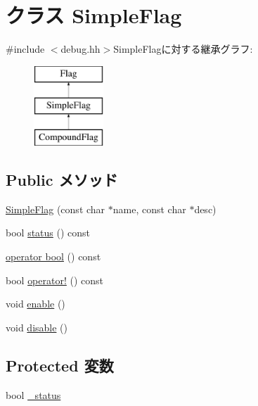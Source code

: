\hypertarget{classDebug_1_1SimpleFlag}{
\section{クラス SimpleFlag}
\label{classDebug_1_1SimpleFlag}
}


{\ttfamily \#include $<$debug.hh$>$}SimpleFlagに対する継承グラフ:\begin{figure}[H]
\begin{center}
\leavevmode
\includegraphics[height=3cm]{classDebug_1_1SimpleFlag}
\end{center}
\end{figure}
\subsection*{Public メソッド}
\begin{DoxyCompactItemize}
\item 
\hyperlink{classDebug_1_1SimpleFlag_a8a90f1268b2771315497edeecc402040}{SimpleFlag} (const char $\ast$name, const char $\ast$desc)
\item 
bool \hyperlink{classDebug_1_1SimpleFlag_a466b2775fe5af9ff94c281d4d1a8fb5a}{status} () const 
\item 
\hyperlink{classDebug_1_1SimpleFlag_aa385aa18f5e42db5a415c25a90f4193d}{operator bool} () const 
\item 
bool \hyperlink{classDebug_1_1SimpleFlag_ac8b1d32dbd52d431450c70b151cfa205}{operator!} () const 
\item 
void \hyperlink{classDebug_1_1SimpleFlag_a486f22824bd83c5308a0d70ffac6f758}{enable} ()
\item 
void \hyperlink{classDebug_1_1SimpleFlag_a8cfbbe53c1cf6e3054736daea3044c0f}{disable} ()
\end{DoxyCompactItemize}
\subsection*{Protected 変数}
\begin{DoxyCompactItemize}
\item 
bool \hyperlink{classDebug_1_1SimpleFlag_ad232e526e83bd3b71faac07c4993487f}{\_\-status}
\end{DoxyCompactItemize}


